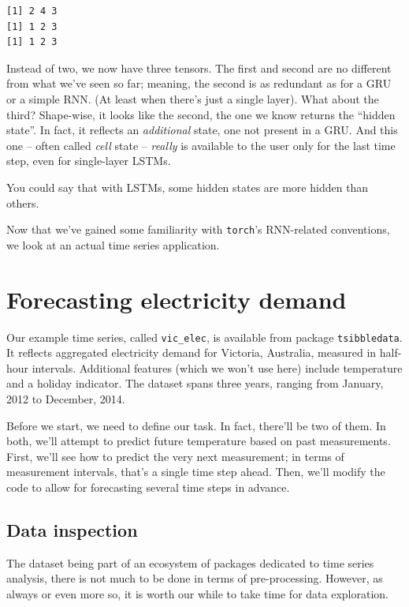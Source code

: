 \documentclass[
  letterpaper,
]{krantz}
\begin{document}
\begin{verbatim}
[1] 2 4 3
[1] 1 2 3
[1] 1 2 3
\end{verbatim}

Instead of two, we now have three tensors. The first and second are no
different from what we've seen so far; meaning, the second is as
redundant as for a GRU or a simple RNN. (At least when there's just a
single layer). What about the third? Shape-wise, it looks like the
second, the one we know returns the ``hidden state''. In fact, it
reflects an \emph{additional} state, one not present in a GRU. And this
one -- often called \emph{cell} state -- \emph{really} is available to
the user only for the last time step, even for single-layer LSTMs.

You could say that with LSTMs, some hidden states are more hidden than
others.

Now that we've gained some familiarity with \texttt{torch}'s RNN-related
conventions, we look at an actual time series application.

\hypertarget{forecasting-electricity-demand}{%
\section{Forecasting electricity
demand}\label{forecasting-electricity-demand}}

Our example time series, called \texttt{vic\_elec}, is available from
package \texttt{tsibbledata}. It reflects aggregated electricity demand
for Victoria, Australia, measured in half-hour intervals. Additional
features (which we won't use here) include temperature and a holiday
indicator. The dataset spans three years, ranging from January, 2012 to
December, 2014.

Before we start, we need to define our task. In fact, there'll be two of
them. In both, we'll attempt to predict future temperature based on past
measurements. First, we'll see how to predict the very next measurement;
in terms of measurement intervals, that's a single time step ahead.
Then, we'll modify the code to allow for forecasting several time steps
in advance.

\hypertarget{data-inspection}{%
\subsection{Data inspection}\label{data-inspection}}

The dataset being part of an ecosystem of packages dedicated to time
series analysis, there is not much to be done in terms of
pre-processing. However, as always or even more so, it is worth our
while to take time for data exploration.
\end{document}
